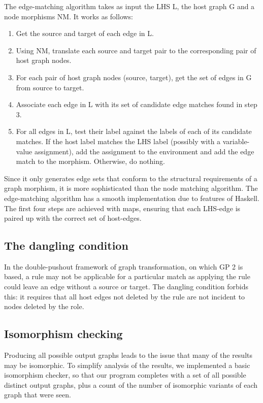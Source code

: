 The edge-matching algorithm takes as input the LHS L, the host graph G and a node morphisms NM. It works as follows:


\begin{enumerate}
	\item Get the source and target of each edge in L.
	\item Using NM, translate each source and target pair to the corresponding pair of host graph nodes.
	\item For each pair of host graph nodes (source, target), get the set of edges in G from source to target.
	\item Associate each edge in L with its set of candidate edge matches found in step 3.
	\item For all edges in L, test their label against the labels of each of its candidate matches. If the host label matches the LHS label (possibly with a variable-value assignment), add the assignment to the environment and add the edge match to the morphism. Otherwise, do nothing.
\end{enumerate}


Since it only generates edge sets that conform to the structural requirements of a graph morphism, it is more sophisticated than the node matching algorithm. The edge-matching algorithm has a smooth implementation due to features of Haskell. The first four steps are achieved with maps, ensuring that each LHS-edge is paired up with the correct set of host-edges.


\subsection{The dangling condition}

In the double-pushout framework of graph transformation, on which GP 2 is based, a rule may not be applicable for a particular match as applying the rule could leave an edge without a source or target. The dangling condition forbids this: it requires that all host edges not deleted by the rule are not incident to nodes deleted by the role.


\subsection{Isomorphism checking}

Producing all possible output graphs leads to the issue that many of the results may be isomorphic. To simplify analysis of the results, we implemented a basic isomorphism checker, so that our program completes with a set of all possible distinct output graphs, plus a count of the number of isomorphic variants of each graph that were seen.


